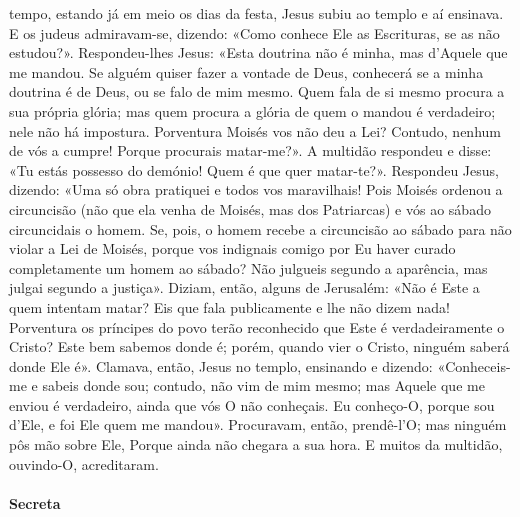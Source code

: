 \begin{paracol}{2}
{ tempo, estando já em meio os dias da festa, Jesus subiu ao templo e aí ensinava. E os judeus admiravam-se, dizendo: «Como conhece Ele as Escrituras, se as não estudou?». Respondeu-lhes Jesus: «Esta doutrina não é minha, mas d’Aquele que me mandou. Se alguém quiser fazer a vontade de Deus, conhecerá se a minha doutrina é de Deus, ou se falo de mim mesmo. Quem fala de si mesmo procura a sua própria glória; mas quem procura a glória de quem o mandou é verdadeiro; nele não há impostura. Porventura Moisés vos não deu a Lei? Contudo, nenhum de vós a cumpre! Porque procurais matar-me?». A multidão respondeu e disse: «Tu estás possesso do demónio! Quem é que quer matar-te?». Respondeu Jesus, dizendo: «Uma só obra pratiquei e todos vos maravilhais! Pois Moisés ordenou a circuncisão (não que ela venha de Moisés, mas dos Patriarcas) e vós ao sábado circuncidais o homem. Se, pois, o homem recebe a circuncisão ao sábado para não violar a Lei de Moisés, porque vos indignais comigo por Eu haver curado completamente um homem ao sábado? Não julgueis segundo a aparência, mas julgai segundo a justiça». Diziam, então, alguns de Jerusalém: «Não é Este a quem intentam matar? Eis que fala publicamente e lhe não dizem nada! Porventura os príncipes do povo terão reconhecido que Este é verdadeiramente o Cristo? Este bem sabemos donde é; porém, quando vier o Cristo, ninguém saberá donde Ele é». Clamava, então, Jesus no templo, ensinando e dizendo: «Conheceis-me e sabeis donde sou; contudo, não vim de mim mesmo; mas Aquele que me enviou é verdadeiro, ainda que vós O não conheçais. Eu conheço-O, porque sou d’Ele, e foi Ele quem me mandou». Procuravam, então, prendê-l’O; mas ninguém pôs mão sobre Ele, Porque ainda não chegara a sua hora. E muitos da multidão, ouvindo-O, acreditaram.
}\end{paracol}

\begin{paracol}{2}\switchcolumn{}\end{paracol}

\paragraph{Secreta}
\begin{paracol}{2}\switchcolumn{}\end{paracol}

